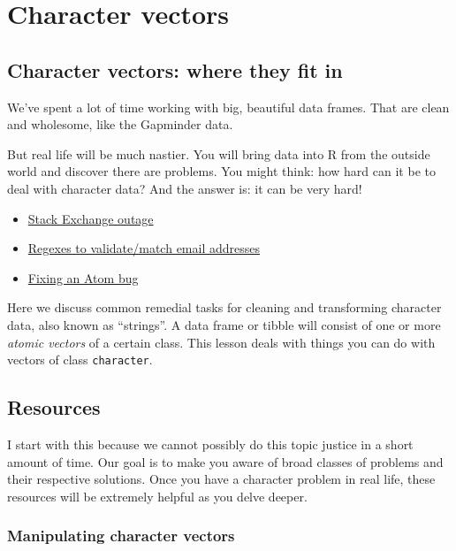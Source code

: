 \documentclass[
]{book}
\providecommand{\tightlist}{%
  \setlength{\itemsep}{0pt}\setlength{\parskip}{0pt}}
\begin{document}
\hypertarget{character-vectors}{%
\chapter{Character vectors}\label{character-vectors}}

\hypertarget{character-vectors-where-they-fit-in}{%
\section{Character vectors: where they fit in}\label{character-vectors-where-they-fit-in}}

We've spent a lot of time working with big, beautiful data frames. That are clean and wholesome, like the Gapminder data.

But real life will be much nastier. You will bring data into R from the outside world and discover there are problems. You might think: how hard can it be to deal with character data? And the answer is: it can be very hard!

\begin{itemize}
\tightlist
\item
  \href{https://stackstatus.net/post/147710624694/outage-postmortem-july-20-2016}{Stack Exchange outage}
\item
  \href{https://emailregex.com}{Regexes to validate/match email addresses}
\item
  \href{https://davidvgalbraith.com/how-i-fixed-atom/}{Fixing an Atom bug}
\end{itemize}

Here we discuss common remedial tasks for cleaning and transforming character data, also known as ``strings''. A data frame or tibble will consist of one or more \emph{atomic vectors} of a certain class. This lesson deals with things you can do with vectors of class \texttt{character}.

\hypertarget{resources}{%
\section{Resources}\label{resources}}

I start with this because we cannot possibly do this topic justice in a short amount of time. Our goal is to make you aware of broad classes of problems and their respective solutions. Once you have a character problem in real life, these resources will be extremely helpful as you delve deeper.

\hypertarget{manipulating-character-vectors}{%
\subsection{Manipulating character vectors}\label{manipulating-character-vectors}}
\end{document}
